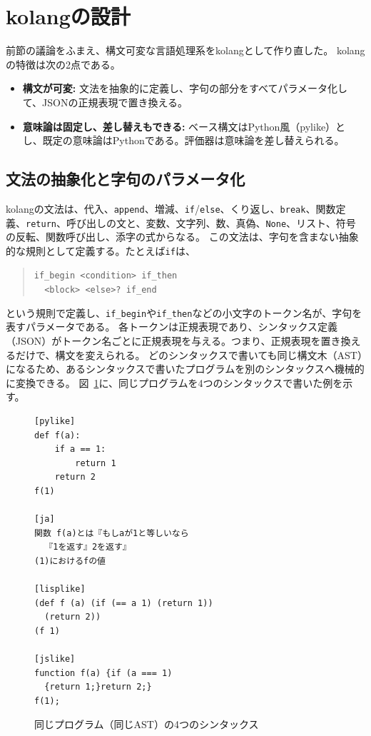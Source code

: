 \documentclass{ipsjprosym}
\begin{document}
\section{kolangの設計}
\label{sec:design}

前節の議論をふまえ、構文可変な言語処理系をkolangとして作り直した。
kolangの特徴は次の2点である。

\begin{itemize}
  \item \textbf{構文が可変:} 文法を抽象的に定義し、字句の部分をすべてパラメータ化して、JSONの正規表現で置き換える。
  \item \textbf{意味論は固定し、差し替えもできる:} ベース構文はPython風（pylike）とし、既定の意味論はPythonである。評価器は意味論を差し替えられる。
\end{itemize}

\subsection{文法の抽象化と字句のパラメータ化}

kolangの文法は、代入、\verb|append|、増減、\verb|if|/\verb|else|、くり返し、\verb|break|、関数定義、\verb|return|、呼び出しの文と、変数、文字列、数、真偽、\verb|None|、リスト、符号の反転、関数呼び出し、添字の式からなる。
この文法は、字句を含まない抽象的な規則として定義する。たとえば\verb|if|は、
\begin{quote}
\verb|if_begin <condition> if_then|\\
\verb|  <block> <else>? if_end|
\end{quote}
という規則で定義し、\verb|if_begin|や\verb|if_then|などの小文字のトークン名が、字句を表すパラメータである。
各トークンは正規表現であり、シンタックス定義（JSON）がトークン名ごとに正規表現を与える。つまり、正規表現を置き換えるだけで、構文を変えられる。
どのシンタックスで書いても同じ構文木（AST）になるため、あるシンタックスで書いたプログラムを別のシンタックスへ機械的に変換できる。
図~\ref{fig:syntaxes}に、同じプログラムを4つのシンタックスで書いた例を示す。

\begin{figure}[t]
\centering
\small
\begin{verbatim}
[pylike]
def f(a):
    if a == 1:
        return 1
    return 2
f(1)

[ja]
関数 f(a)とは『もしaが1と等しいなら
  『1を返す』2を返す』
(1)におけるfの値

[lisplike]
(def f (a) (if (== a 1) (return 1))
  (return 2))
(f 1)

[jslike]
function f(a) {if (a === 1)
  {return 1;}return 2;}
f(1);
\end{verbatim}
\caption{同じプログラム（同じAST）の4つのシンタックス}
\label{fig:syntaxes}
\end{figure}
\end{document}
